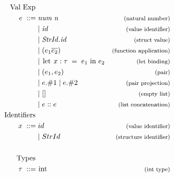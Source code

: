 \begin{figure}[htb]
\begin{align*}
\begin{aligned}
\text{Val Exp } \\
e \; ::= \; &\mathit{num \; n \;}     &\expl{(natural number)} \\
&|\;\mathit{id}                       &\expl{(value identifier)}\\
&|\;\mathit{StrId.id}                 &\expl{(struct value)}\\
&|\;(e_{1} \overline{e_{2}})                        & \expl{(function application)}\\
&|\;\text{\lsttext{let}}\; x : \tau \; =\; e_{1}\; \text{\lsttext{in}} \; e_{2}
                                      &\expl{(let binding)}\\
&|\;(e_{1}, e_{2})                    &\expl{(pair)}\\
&|\;e.\#1 \;| \;e.\#2                 &\expl{(pair projection)}\\
&|\;[]                                &\expl{(empty list)}\\
&|\;e::e                              &\expl{(list concatenation)}
\\
\text{Identifiers } \\
x \; ::= \; &id                      & \expl{(value identifier)}\\ 
&|\;StrId                            & \expl{(structure identifier)}\\
\\
\text{Types }\\
\tau \; ::= \; &\text{\lsttext{int}}  &\expl{(int type)}\\

\end{aligned}
\end{align*}
\end{figure}
